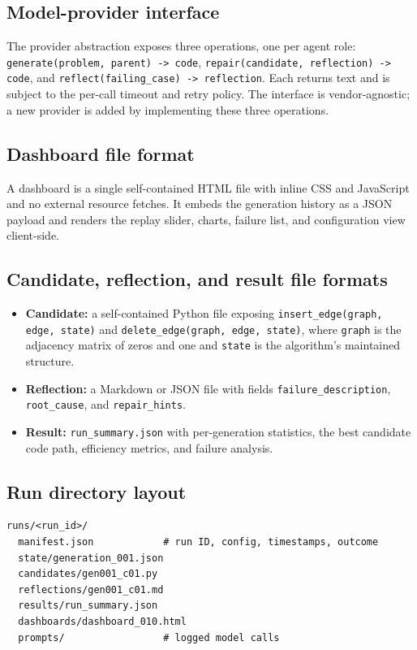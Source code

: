 \documentclass[12pt,a4paper]{article}
\begin{document}
\subsection{Model-provider interface}

The provider abstraction exposes three operations, one per agent role: \texttt{generate(problem, parent) -> code}, \texttt{repair(candidate, reflection) -> code}, and \texttt{reflect(failing\_case) -> reflection}. Each returns text and is subject to the per-call timeout and retry policy. The interface is vendor-agnostic; a new provider is added by implementing these three operations.

\subsection{Dashboard file format}

A dashboard is a single self-contained HTML file with inline CSS and JavaScript and no external resource fetches. It embeds the generation history as a JSON payload and renders the replay slider, charts, failure list, and configuration view client-side.

\subsection{Candidate, reflection, and result file formats}

\begin{itemize}
  \item \textbf{Candidate:} a self-contained Python file exposing \texttt{insert\_edge(graph, edge, state)} and \texttt{delete\_edge(graph, edge, state)}, where \texttt{graph} is the adjacency matrix of zeros and one and \texttt{state} is the algorithm's maintained structure.
  \item \textbf{Reflection:} a Markdown or JSON file with fields \texttt{failure\_description}, \texttt{root\_cause}, and \texttt{repair\_hints}.
  \item \textbf{Result:} \texttt{run\_summary.json} with per-generation statistics, the best candidate code path, efficiency metrics, and failure analysis.
\end{itemize}

\subsection{Run directory layout}

\begin{verbatim}
runs/<run_id>/
  manifest.json            # run ID, config, timestamps, outcome
  state/generation_001.json
  candidates/gen001_c01.py
  reflections/gen001_c01.md
  results/run_summary.json
  dashboards/dashboard_010.html
  prompts/                 # logged model calls
\end{verbatim}
\end{document}
